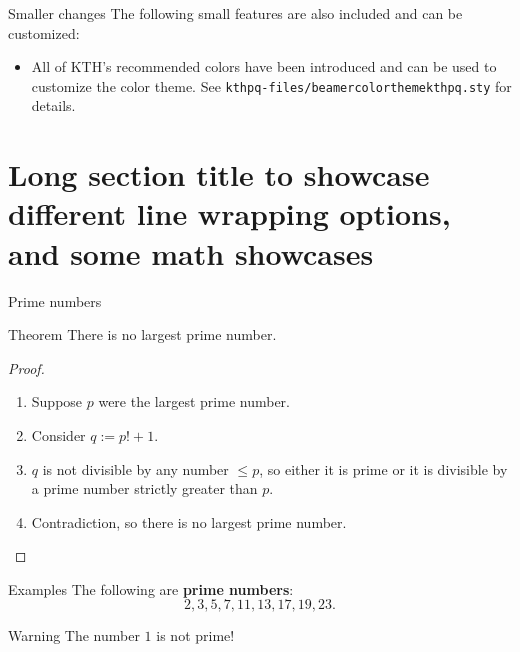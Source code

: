 \documentclass[17pt, t, lualatex]{beamer}
\renewcommand*{\emph}[1]{{\color{digital blue} \bfseries #1}}
\begin{document}
\begin{frame}[fragile=singleslide]{Smaller changes}
The following small features are also included and can be customized:
\begin{itemize}
\item All of KTH's recommended colors have been introduced and can be used to customize the color theme. See \texttt{kthpq-files/beamercolorthemekthpq.sty} for details.
\end{itemize}
\end{frame}

\section{Long section title to showcase different line wrapping options, and some math showcases}

\insertsectionpage


\begin{frame}{Prime numbers}
\begin{block}{Theorem}
There is no largest prime number.
\end{block}

\begin{proof}
\begin{enumerate}
\item Suppose $p$ were the largest prime number.
\item Consider $q := p! + 1$.
\item $q$ is not divisible by any number $\leq p$, so either it is prime or it is divisible by a prime number strictly greater than $p$.
\item Contradiction, so there is no largest prime number.
\end{enumerate}
\end{proof}
\end{frame}

\begin{frame}
\begin{exampleblock}{Examples}
The following are \emph{prime numbers}:
\[
2, 3, 5, 7, 11, 13, 17, 19, 23.
\]
\end{exampleblock}

\begin{alertblock}{Warning}
The number $1$ is not prime!
\end{alertblock}
\end{frame}
\end{document}
